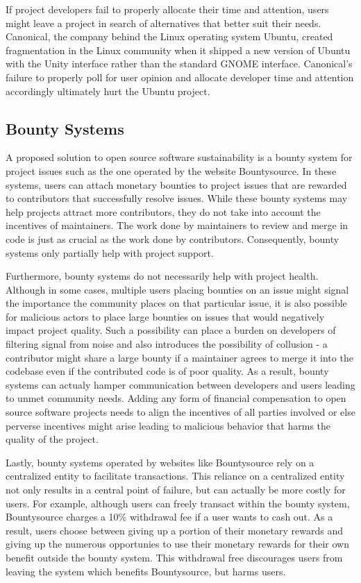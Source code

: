 If project developers fail to properly allocate their time and attention, users
might leave a project in search of alternatives that better suit
their needs. Canonical, the company behind the Linux operating system Ubuntu,
created fragmentation in the Linux community when it shipped a new version of
Ubuntu with the Unity interface rather than the standard GNOME
interface\cite{ubuntuUnity}. Canonical's failure to properly poll for user
opinion and allocate developer time and attention accordingly ultimately hurt
the Ubuntu project.

\subsection{Bounty Systems}

A proposed solution to open source software sustainability is a bounty system
for project issues such as the one operated by the website
Bountysource\cite{bountysource}. In these systems, users can attach monetary
bounties to project issues that are rewarded to contributors that successfully
resolve issues. While these bounty systems may help projects attract more
contributors, they do not take into account the incentives of maintainers. The
work done by maintainers to review and merge in code is just
as crucial as the work done by contributors. Consequently, bounty systems only
partially help with project support.

Furthermore, bounty systems do not necessarily help with
project health. Although in some cases, multiple users placing bounties on an
issue might signal the importance the community places on that particular issue,
it is also possible for malicious actors to place large bounties on issues that
would negatively impact project quality. Such a possibility can place a burden
on developers of filtering signal from noise and also introduces the possibility
of collusion - a contributor might share a large bounty if a maintainer agrees
to merge it into the codebase even if the contributed code is of poor quality.
As a result, bounty systems can actualy hamper communication
between developers and users leading to unmet community needs. Adding any form of financial compensation to open source
software projects needs to align the incentives of all parties
involved or else perverse incentives might arise leading to malicious behavior
that harms the quality of the project.

Lastly, bounty systems operated by websites like Bountysource rely on a
centralized entity to facilitate transactions. This reliance on a centralized
entity not only results in a central point of failure, but can actually be more
costly for users. For example, although users can freely transact within the bounty system, Bountysource
charges a 10\% withdrawal fee if a user wants to cash out. As a result, users
choose between giving up a portion of their monetary rewards and giving up the numerous
opportunies to use their monetary rewards for their own benefit outside the bounty system. This withdrawal free
discourages users from leaving the system which benefits Bountysource, but harms users.

